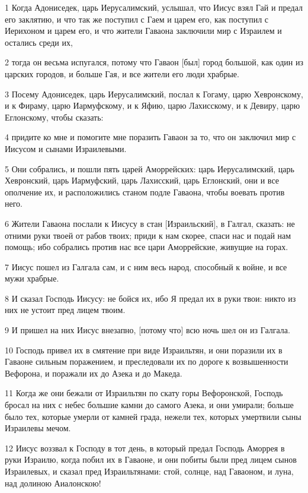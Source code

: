 \par 1 Когда Адониседек, царь Иерусалимский, услышал, что Иисус взял Гай и предал его заклятию, и что так же поступил с Гаем и царем его, как поступил с Иерихоном и царем его, и что жители Гаваона заключили мир с Израилем и остались среди их,
\par 2 тогда он весьма испугался, потому что Гаваон [был] город большой, как один из царских городов, и больше Гая, и все жители его люди храбрые.
\par 3 Посему Адониседек, царь Иерусалимский, послал к Гогаму, царю Хевронскому, и к Фираму, царю Иармуфскому, и к Яфию, царю Лахисскому, и к Девиру, царю Еглонскому, чтобы сказать:
\par 4 придите ко мне и помогите мне поразить Гаваон за то, что он заключил мир с Иисусом и сынами Израилевыми.
\par 5 Они собрались, и пошли пять царей Аморрейских: царь Иерусалимский, царь Хевронский, царь Иармуфский, царь Лахисский, царь Еглонский, они и все ополчение их, и расположились станом подле Гаваона, чтобы воевать против него.
\par 6 Жители Гаваона послали к Иисусу в стан [Израильский], в Галгал, сказать: не отними руки твоей от рабов твоих; приди к нам скорее, спаси нас и подай нам помощь; ибо собрались против нас все цари Аморрейские, живущие на горах.
\par 7 Иисус пошел из Галгала сам, и с ним весь народ, способный к войне, и все мужи храбрые.
\par 8 И сказал Господь Иисусу: не бойся их, ибо Я предал их в руки твои: никто из них не устоит пред лицем твоим.
\par 9 И пришел на них Иисус внезапно, [потому что] всю ночь шел он из Галгала.
\par 10 Господь привел их в смятение при виде Израильтян, и они поразили их в Гаваоне сильным поражением, и преследовали их по дороге к возвышенности Вефорона, и поражали их до Азека и до Македа.
\par 11 Когда же они бежали от Израильтян по скату горы Вефоронской, Господь бросал на них с небес большие камни до самого Азека, и они умирали; больше было тех, которые умерли от камней града, нежели тех, которых умертвили сыны Израилевы мечом.
\par 12 Иисус воззвал к Господу в тот день, в который предал Господь Аморрея в руки Израилю, когда побил их в Гаваоне, и они побиты были пред лицем сынов Израилевых, и сказал пред Израильтянами: стой, солнце, над Гаваоном, и луна, над долиною Аиалонскою!
